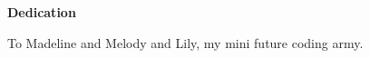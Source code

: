 \newpage
{}
\begin{center}
\textbf{Dedication}

\vspace{0.2in}
To Madeline and Melody and Lily, my mini future coding army.
\end{center}
